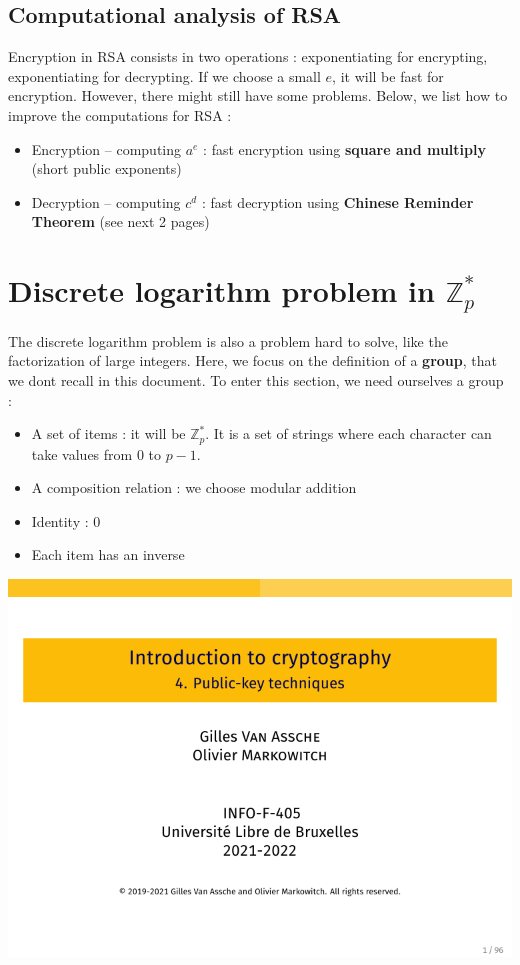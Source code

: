 \documentclass[../Cryptography.tex]{subfiles}
\begin{document}
\subsection{Computational analysis of RSA}
Encryption in RSA consists in two operations : exponentiating for encrypting, exponentiating for decrypting. If we choose a small $e$, it will be fast for encryption. However, there might still have some problems. Below, we list how to improve the computations for RSA :
\begin{itemize}
    \item Encryption -- computing $a^e$ : fast encryption using \textbf{square and multiply} (short public exponents)
    \item Decryption -- computing $c^d$ : fast decryption using \textbf{Chinese Reminder Theorem} (see next 2 pages)
\end{itemize}


\section{Discrete logarithm problem in $\mathbb{Z}_p ^*$}
The discrete logarithm problem is also a problem hard to solve, like the factorization of large integers. Here, we focus on the definition of a \textbf{group}, that we dont recall in this document. To enter this section, we need ourselves a group :
\begin{itemize}
    \item A set of items : it will be $\mathbb{Z}_p ^*$. It is a set of strings where each character can take values from $0$ to $p-1$.
    \item A composition relation : we choose modular addition
    \item Identity : $0$
    \item Each item has an inverse
\end{itemize}
\begin{center}
    \includegraphics[width=0.8\linewidth, page=62]{Slides/4-Public.pdf}
\end{center}
\end{document}
